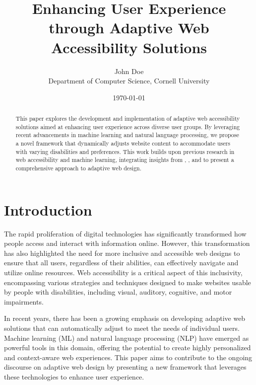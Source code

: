 \documentclass[11pt]{article}
\begin{document}
\title{Enhancing User Experience through Adaptive Web Accessibility Solutions}
\author{John Doe\\
Department of Computer Science, Cornell University\\
}
\date{\today}

\maketitle

\begin{abstract}
This paper explores the development and implementation of adaptive web accessibility solutions aimed at enhancing user experience across diverse user groups. By leveraging recent advancements in machine learning and natural language processing, we propose a novel framework that dynamically adjusts website content to accommodate users with varying disabilities and preferences. This work builds upon previous research in web accessibility and machine learning, integrating insights from \citet{arXiv}, \citet{arXiv}, and \citet{arXiv} to present a comprehensive approach to adaptive web design.
\end{abstract}

\section{Introduction}
The rapid proliferation of digital technologies has significantly transformed how people access and interact with information online. However, this transformation has also highlighted the need for more inclusive and accessible web designs to ensure that all users, regardless of their abilities, can effectively navigate and utilize online resources. Web accessibility is a critical aspect of this inclusivity, encompassing various strategies and techniques designed to make websites usable by people with disabilities, including visual, auditory, cognitive, and motor impairments.

In recent years, there has been a growing emphasis on developing adaptive web solutions that can automatically adjust to meet the needs of individual users. Machine learning (ML) and natural language processing (NLP) have emerged as powerful tools in this domain, offering the potential to create highly personalized and context-aware web experiences. This paper aims to contribute to the ongoing discourse on adaptive web design by presenting a new framework that leverages these technologies to enhance user experience.
\end{document}
